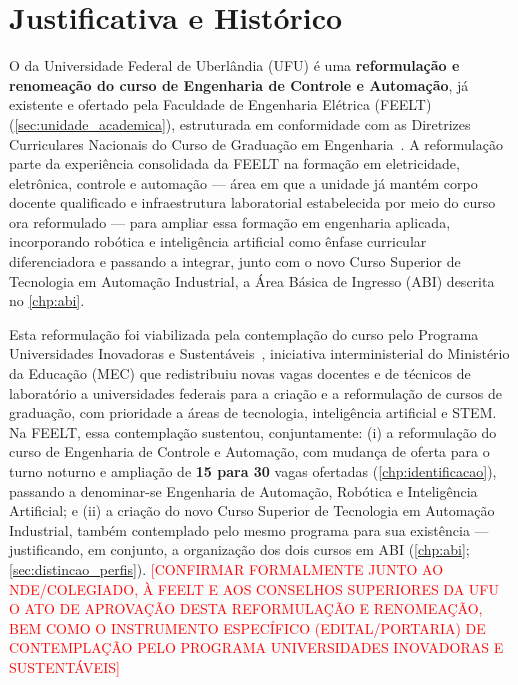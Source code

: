 \chapter{Justificativa e Histórico}
\label{chp:justificativa}

O \ppccurso da Universidade Federal de Uberlândia (UFU) é uma \textbf{reformulação e renomeação do curso de Engenharia de Controle e Automação}, já existente e ofertado pela Faculdade de Engenharia Elétrica (FEELT) (\autoref{sec:unidade_academica}), estruturada em conformidade com as Diretrizes Curriculares Nacionais do Curso de Graduação em Engenharia~\cite{cne_ces_2_2019,cne_ces_1_2021}. A reformulação parte da experiência consolidada da FEELT na formação em eletricidade, eletrônica, controle e automação — área em que a unidade já mantém corpo docente qualificado e infraestrutura laboratorial estabelecida por meio do curso ora reformulado — para ampliar essa formação em engenharia aplicada, incorporando robótica e inteligência artificial como ênfase curricular diferenciadora e passando a integrar, junto com o novo Curso Superior de Tecnologia em Automação Industrial, a Área Básica de Ingresso (ABI) descrita no \autoref{chp:abi}.

Esta reformulação foi viabilizada pela contemplação do curso pelo Programa Universidades Inovadoras e Sustentáveis~\cite{programa_universidades_inovadoras_sustentaveis}, iniciativa interministerial do Ministério da Educação (MEC) que redistribuiu novas vagas docentes e de técnicos de laboratório a universidades federais para a criação e a reformulação de cursos de graduação, com prioridade a áreas de tecnologia, inteligência artificial e STEM. Na FEELT, essa contemplação sustentou, conjuntamente: (i) a reformulação do curso de Engenharia de Controle e Automação, com mudança de oferta para o turno noturno e ampliação de \textbf{15 para 30} vagas ofertadas (\autoref{chp:identificacao}), passando a denominar-se Engenharia de Automação, Robótica e Inteligência Artificial; e (ii) a criação do novo Curso Superior de Tecnologia em Automação Industrial, também contemplado pelo mesmo programa para sua existência — justificando, em conjunto, a organização dos dois cursos em ABI (\autoref{chp:abi}; \autoref{sec:distincao_perfis}). \textcolor{red}{[CONFIRMAR FORMALMENTE JUNTO AO NDE/COLEGIADO, À FEELT E AOS CONSELHOS SUPERIORES DA UFU O ATO DE APROVAÇÃO DESTA REFORMULAÇÃO E RENOMEAÇÃO, BEM COMO O INSTRUMENTO ESPECÍFICO (EDITAL/PORTARIA) DE CONTEMPLAÇÃO PELO PROGRAMA UNIVERSIDADES INOVADORAS E SUSTENTÁVEIS]}


